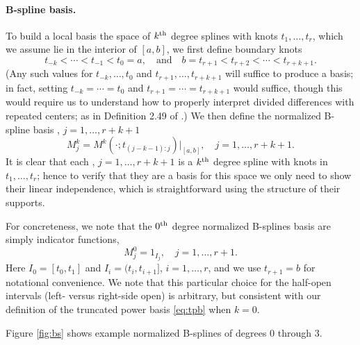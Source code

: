 \documentclass{article}
\begin{document}
\paragraph{B-spline basis.}  

To build a local basis the space of $k^{\text{th}}$ degree splines with knots
$t_1,\dots,t_r$, which we assume lie in the interior of $[a,b]$, we first define
boundary knots   
\[
t_{-k} < \cdots < t_{-1} < t_0 = a, \quad \text{and} \quad 
b = t_{r+1} < t_{r+2} < \cdots < t_{r+k+1}. 
\]
(Any such values for $t_{-k},\dots,t_0$ and $t_{r+1},\dots,t_{r+k+1}$ will
suffice to produce a basis; in fact, setting $t_{-k}=\cdots=t_0$ and
$t_{r+1}=\cdots=t_{r+k+1}$ would suffice, though this would require us to 
understand how to properly interpret divided differences with repeated centers;
as in Definition 2.49 of \citet{schumaker2007spline}.)  We then define the
normalized B-spline basis , $j=1,\dots,r+k+1$ 
\[
M^k_j = M^k(\cdot ; t_{(j-k-1):j}) \Big|_{[a,b]}, 
\quad j=1,\dots,r+k+1. 
\]
It is clear that each , $j=1,\dots,r+k+1$ is a $k^{\text{th}}$ degree    
spline with knots in $t_1,\dots,t_r$; hence to verify that they are a basis for
this space we only need to show their linear independence, which is
straightforward using the structure of their supports. 

For concreteness, we note that the $0^{\text{th}}$ degree normalized B-splines basis are
simply indicator functions,
\[
M^0_j = 1_{I_j}, \quad j=1,\dots,r+1.
\]
Here $I_0=[t_0,t_1]$ and $I_i=(t_i,t_{i+1}]$, $i=1,\dots,r$, and we use
$t_{r+1}=b$ for notational convenience. We note that this particular choice for
the half-open intervals (left- versus right-side open) is arbitrary, but
consistent with our definition of the truncated power basis \eqref{eq:tpb}
when $k=0$. 

Figure \ref{fig:bs} shows example normalized B-splines of degrees 0 through 3.    
\end{document}
